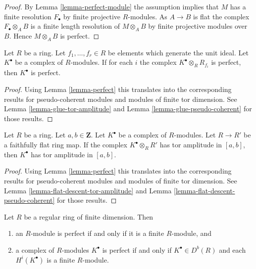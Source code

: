 \begin{proof}
By
Lemma \ref{lemma-perfect-module}
the assumption implies that $M$ has a finite resolution $F_\bullet$ by
finite projective $R$-modules. As $A \to B$ is flat the complex
$F_\bullet \otimes_A B$ is a finite length resolution of $M \otimes_A B$
by finite projective modules over $B$. Hence $M \otimes_A B$ is perfect.
\end{proof}

\begin{lemma}
\label{lemma-glue-perfect}
Let $R$ be a ring. Let $f_1, \ldots, f_r \in R$ be elements which
generate the unit ideal. Let $K^\bullet$
be a complex of $R$-modules. If for each $i$ the complex
$K^\bullet \otimes_R R_{f_i}$ is perfect,
then $K^\bullet$ is perfect.
\end{lemma}

\begin{proof}
Using
Lemma \ref{lemma-perfect}
this translates into the corresponding results for pseudo-coherent modules
and modules of finite tor dimension. See
Lemma \ref{lemma-glue-tor-amplitude}
and
Lemma \ref{lemma-glue-pseudo-coherent}
for those results.
\end{proof}

\begin{lemma}
\label{lemma-flat-descent-perfect}
Let $R$ be a ring. Let $a, b \in \mathbf{Z}$. Let $K^\bullet$
be a complex of $R$-modules. Let $R \to R'$ be a faithfully flat
ring map. If the complex $K^\bullet \otimes_R R'$ has tor amplitude
in $[a, b]$, then $K^\bullet$ has tor amplitude in $[a, b]$.
\end{lemma}

\begin{proof}
Using
Lemma \ref{lemma-perfect}
this translates into the corresponding results for pseudo-coherent modules
and modules of finite tor dimension. See
Lemma \ref{lemma-flat-descent-tor-amplitude}
and
Lemma \ref{lemma-flat-descent-pseudo-coherent}
for those results.
\end{proof}

\begin{lemma}
\label{lemma-regular-perfect}
Let $R$ be a regular ring of finite dimension. Then
\begin{enumerate}
\item an $R$-module is perfect if and only if it is a finite $R$-module, and
\item a complex of $R$-modules $K^\bullet$ is perfect if and only
if $K^\bullet \in D^b(R)$ and each $H^i(K^\bullet)$ is a finite $R$-module.
\end{enumerate}
\end{lemma}

